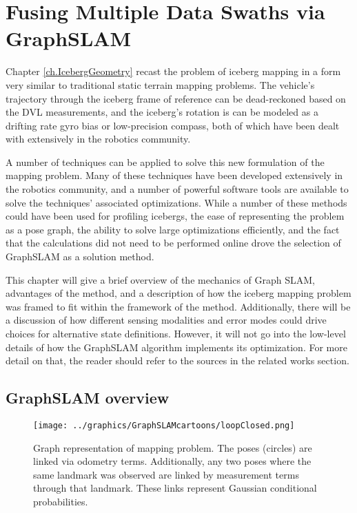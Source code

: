 
\chapter{Fusing Multiple Data Swaths via GraphSLAM}
\label{ch.GraphSLAM}

Chapter \ref{ch.IcebergGeometry} recast the problem of iceberg mapping in a form very similar to traditional static terrain mapping problems. The vehicle's trajectory through the iceberg frame of reference can be dead-reckoned based on the DVL measurements, and the iceberg's rotation is can be modeled as a drifting rate gyro bias or low-precision compass, both of which have been dealt with extensively in the robotics community.

A number of techniques can be applied to solve this new formulation of the mapping problem. Many of these techniques have been developed extensively in the robotics community, and a number of powerful software tools are available to solve the techniques' associated optimizations. While a number of these methods could have been used for profiling icebergs, the ease of representing the problem as a pose graph, the ability to solve large optimizations efficiently, and the fact that the calculations did not need to be performed online drove the selection of GraphSLAM as a solution method. 

This chapter will give a brief overview of the mechanics of Graph SLAM, advantages of the method, and a description of how the iceberg mapping problem was framed to fit within the framework of the method. Additionally, there will be a discussion of how different sensing modalities and error modes could drive choices for alternative state definitions. However, it will not go into the low-level details of how the GraphSLAM algorithm implements its optimization. For more detail on that, the reader should refer to the sources in the related works section.

\section{GraphSLAM overview}

\begin{figure}[htb]
   \centering
   \texttt{[image: ../graphics/GraphSLAMcartoons/loopClosed.png]} %
   \caption{Graph representation of mapping problem.  The poses (circles) are linked via odometry terms. Additionally, any two poses where the same landmark was observed are linked by measurement terms through that landmark. These links represent Gaussian conditional probabilities. }
   \label{fig:GraphSLAM}
\end{figure}


